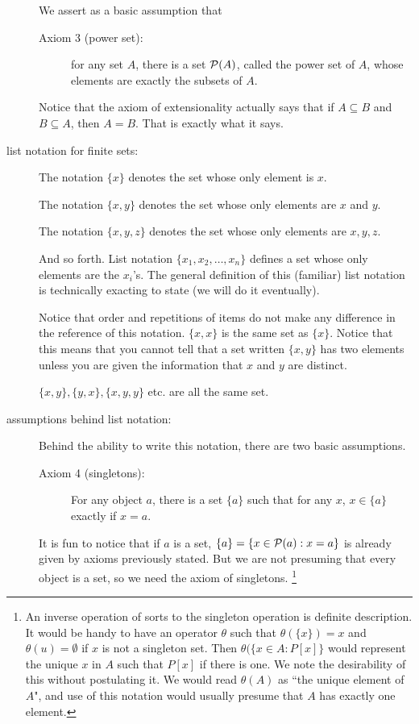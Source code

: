 \documentclass[12pt]{article}
\begin{document}
\begin{description}
We assert as a basic assumption that 

\begin{description}

\item[Axiom 3 (power set):]  for any set $A$, there is a set ${\cal P}(A)$, called the power set of $A$, whose elements are exactly the subsets of $A$.

\end{description}

Notice that the axiom of extensionality actually says that if $A \subseteq B$ and $B \subseteq A$, then $A = B$.   That is exactly what it says.


\item[list notation for finite sets:]  The notation $\{x\}$ denotes the set whose only element is $x$.

The notation $\{x,y\}$ denotes the set whose only elements are $x$ and $y$.

The notation $\{x,y,z\}$ denotes the set whose only elements are $x,y,z$.

And so forth.  List notation $\{x_1,x_2,\ldots,x_n\}$ defines a set whose only elements are the $x_i$'s.
The general definition of this (familiar) list notation is technically exacting to state (we will do it eventually).

Notice that order and repetitions of items do not make any difference in the reference of this notation.
$\{x,x\}$ is the same set as $\{x\}$.  Notice that this means that you cannot tell that a set written $\{x,y\}$ has two elements unless you are given the information that $x$ and $y$ are distinct.

$\{x,y\}, \{y,x\}, \{x,y,y\}$ etc. are all the same set.

\item[assumptions behind list notation:]

Behind the ability to write this notation, there are two basic assumptions.

\begin{description}

\item[Axiom 4 (singletons):]  For any object $a$, there is a set $\{a\}$ such that for any $x$, $x \in \{a\}$ exactly if $x=a$.

\end{description}

It is fun to notice that if $a$ is a set, $\{a\} = \{x \in {\cal P}(a):x=a\}$ is already given by axioms previously stated.
But we are not presuming that every object is a set, so we need the axiom of singletons. \footnote{An inverse operation of sorts to the singleton operation is definite description.  It would be handy to have an operator
$\theta$ such that $\theta(\{x\}) = x$ and $\theta(u) = \emptyset$ if $x$ is not a singleton set.  Then $\theta(\{x \in A:P[x]\}$ would represent the unique $x$ in $A$ such that $P[x]$ if there is one.   We note the desirability of this without postulating it.  We would read $\theta(A)$ as ``the unique element of $A$", and use of this notation would usually presume
that $A$ has exactly one element.}


\end{description}
\end{document}
